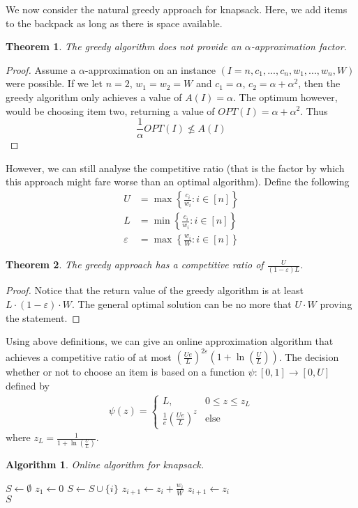\documentclass[a4paper, 12pt]{article}
\newtheorem{theorem}{Theorem}[section]
\newtheorem{alg}{Algorithm}[section]
\begin{document}
	We now consider the natural greedy approach for knapsack. Here, we add items to the backpack as long as there is space available. 
	\begin{theorem}
		The greedy algorithm does not provide an $\alpha$-approximation factor.
	\end{theorem}
	\begin{proof}
		Assume a $\alpha$-approximation on an instance $(I = n, c_1,...,c_n,w_1,...,w_n, W)$ were possible. If we let $n=2$, $w_1=w_2=W$ and $c_1 = \alpha$, $c_2 = \alpha + \alpha^2$, then the greedy algorithm only achieves a value of $A(I) = \alpha$. The optimum however, would be choosing item two, returning a value of $OPT(I) = \alpha + \alpha^2$. Thus \[\frac{1}{\alpha}OPT(I) \not\leq A(I)\]
	\end{proof}
	However, we can still analyse the competitive ratio (that is the factor by which this approach might fare worse than an optimal algorithm). Define the following \begin{align}
		 U &= \max\left\{\frac{c_i}{w_i}: i \in [n]\right\}\\
		 L &= \min\left\{\frac{c_i}{w_i}: i \in [n]\right\}\\
		 \varepsilon &= \max\left\{\frac{w_i}{W}: i \in [n]\right\}
	\end{align}
	\begin{theorem}
		The greedy approach has a competitive ratio of $\frac{U}{(1-\varepsilon)L}$.
	\end{theorem}
	\begin{proof}
		Notice that the return value of the greedy algorithm is at least $L\cdot(1-\varepsilon)\cdot W$. The general optimal solution can be no more that $U\cdot W$ proving the statement.
	\end{proof}
	Using above definitions, we can give an online approximation algorithm that achieves a competitive ratio of at most $\left(\frac{Ue}{L}\right)^{2\varepsilon}\left(1+\ln \left(\frac{U}{L}\right)\right)$. The decision whether or not to choose an item is based on a function $\psi: [0,1] \to [0,U]$ defined by \begin{align}
		\psi(z) = \begin{cases}
			L, & 0 \leq z \leq z_L\\
			\frac{1}{e}\left(\frac{Ue}{L}\right)^z & \text{else}
		\end{cases}
	\end{align}
	where $z_L = \frac{1}{1+\ln(\frac{U}{L})}$.
	\begin{alg} Online algorithm for knapsack. \normalfont
		\begin{algorithmic}[1]
			\State $S \gets \emptyset$
			\State $z_1 \gets 0$
			\State $S \gets S \cup \{i\}$
			\State $z_{i+1} \gets z_i + \frac{w_i}{W}$
			\Else
			\State $z_{i+1} \gets z_i$
			\EndIf
			\EndFor\\
			\Return $S$
		\end{algorithmic}
	\end{alg}
\end{document}
